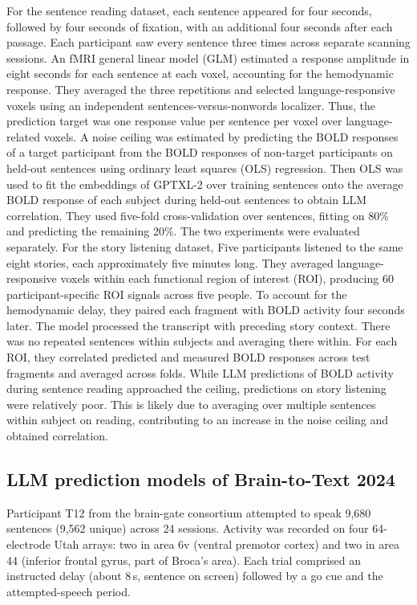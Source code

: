 \documentclass[11pt]{article}
\begin{document}
For the sentence reading dataset, each sentence appeared for four seconds, followed by four seconds of fixation, with an additional four seconds after each passage. Each participant saw every sentence three times across separate scanning sessions. An fMRI general linear model (GLM) estimated a response amplitude in eight seconds for each sentence at each voxel, accounting for the hemodynamic response. They averaged the three repetitions and selected language-responsive voxels using an independent sentences-versus-nonwords localizer. Thus, the prediction target was one response value per sentence per voxel over language-related voxels. A noise ceiling was estimated by predicting the BOLD responses of a target participant from the BOLD responses of non-target participants on held-out sentences using ordinary least squares (OLS) regression. Then OLS was used to fit the embeddings of GPTXL-2 over training sentences onto the average BOLD response of each subject during held-out sentences to obtain LLM correlation. They used five-fold cross-validation over sentences, fitting on 80\% and predicting the remaining 20\%. The two experiments were evaluated separately. For the story listening dataset, Five participants listened to the same eight stories, each approximately five minutes long. They averaged language-responsive voxels within each functional region of interest (ROI), producing 60 participant-specific ROI signals across five people. To account for the hemodynamic delay, they paired each fragment with BOLD activity four seconds later. The model processed the transcript with preceding story context. There was no repeated sentences within subjects and averaging there within. For each ROI, they correlated predicted and measured BOLD responses across test fragments and averaged across folds. While LLM predictions of BOLD activity during sentence reading approached the ceiling, predictions on story listening were relatively poor. This is likely due to averaging over multiple sentences within subject on reading, contributing to an increase in the noise ceiling and obtained correlation.

\subsection{LLM prediction models of Brain-to-Text 2024}

Participant T12 from the brain-gate consortium\cite{willett2023speech} attempted to speak 9,680 sentences (9,562 unique) across 24 sessions. Activity was recorded on four 64-electrode Utah arrays: two in area 6v (ventral premotor cortex) and two in area 44 (inferior frontal gyrus, part of Broca's area). Each trial comprised an instructed delay (about 8\,s, sentence on screen) followed by a go cue and the attempted-speech period.
\end{document}
